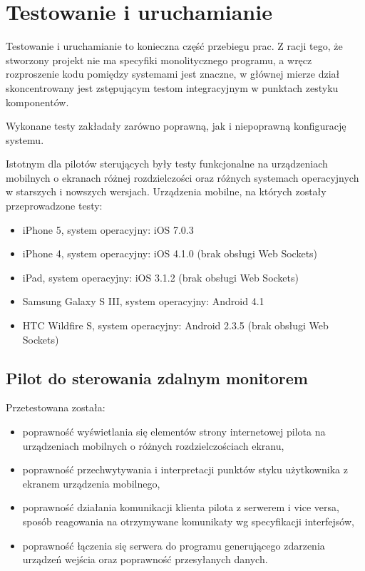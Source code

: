 \newpage
\section{Testowanie i uruchamianie}

Testowanie i uruchamianie to konieczna część przebiegu prac. Z racji tego, że stworzony projekt nie ma specyfiki monolitycznego programu, a wręcz rozproszenie kodu pomiędzy systemami jest znaczne, w głównej mierze dział skoncentrowany jest zstępującym testom integracyjnym w punktach zestyku komponentów.

Wykonane testy zakładały zarówno poprawną, jak i niepoprawną konfigurację systemu.

Istotnym dla pilotów sterujących były testy funkcjonalne na urządzeniach mobilnych o ekranach różnej rozdzielczości oraz różnych systemach operacyjnych w starszych i nowszych wersjach. Urządzenia mobilne, na których zostały przeprowadzone testy:
\begin{itemize}
	\item iPhone 5, system operacyjny: iOS 7.0.3
	\item iPhone 4, system operacyjny: iOS 4.1.0 (brak obsługi Web Sockets)
	\item iPad, system operacyjny: iOS 3.1.2 (brak obsługi Web Sockets)
	\item Samsung Galaxy S III, system operacyjny: Android 4.1
	\item HTC Wildfire S, system operacyjny: Android 2.3.5 (brak obsługi Web Sockets)
\end{itemize}

\subsection{Pilot do sterowania zdalnym monitorem}

Przetestowana została:

\begin{itemize}
	\item poprawność wyświetlania się elementów strony internetowej pilota na urządzeniach mobilnych o różnych rozdzielczościach ekranu,
	\item poprawność przechwytywania i interpretacji punktów styku użytkownika z ekranem urządzenia mobilnego,
	\item poprawność działania komunikacji klienta pilota z serwerem i vice versa, sposób reagowania na otrzymywane komunikaty wg specyfikacji interfejsów,
	\item poprawność łączenia się serwera do programu generującego zdarzenia urządzeń wejścia oraz poprawność przesyłanych danych.
\end{itemize}

